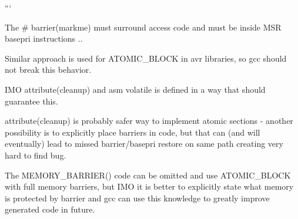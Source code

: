 ```

The \# barrier(markme) must surround access code and must be inside M\+S\+R basepri instructions ..

Similar approach is used for A\+T\+O\+M\+I\+C\+\_\+\+B\+L\+O\+C\+K in avr libraries, so gcc should not break this behavior.

I\+M\+O attribute(cleanup) and asm volatile is defined in a way that should guarantee this.

attribute(cleanup) is probably safer way to implement atomic sections -\/ another possibility is to explicitly place barriers in code, but that can (and will eventually) lead to missed barrier/basepri restore on same path creating very hard to find bug.

The M\+E\+M\+O\+R\+Y\+\_\+\+B\+A\+R\+R\+I\+E\+R() code can be omitted and use A\+T\+O\+M\+I\+C\+\_\+\+B\+L\+O\+C\+K with full memory barriers, but I\+M\+O it is better to explicitly state what memory is protected by barrier and gcc can use this knowledge to greatly improve generated code in future. 